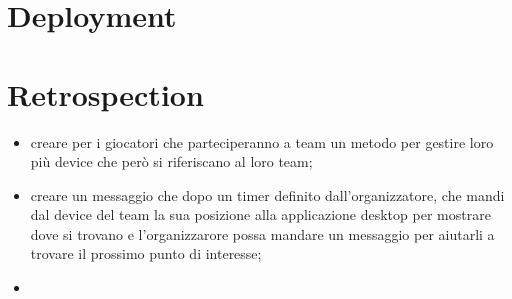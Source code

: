 \documentclass[12pt, english]{report}
\begin{document}
\section{Deployment}
\section{Retrospection}
\begin{itemize}
	\item creare per i giocatori che parteciperanno a team un metodo per gestire loro più device che però si riferiscano al loro team;
	\item creare un messaggio che dopo un timer definito dall'organizzatore, che mandi dal device del team la sua posizione alla applicazione desktop per mostrare dove si trovano e l'organizzarore possa mandare un messaggio per aiutarli a trovare il prossimo punto di interesse;
	\item 
\end{itemize}

\vspace{-30pt}
\end{document}
